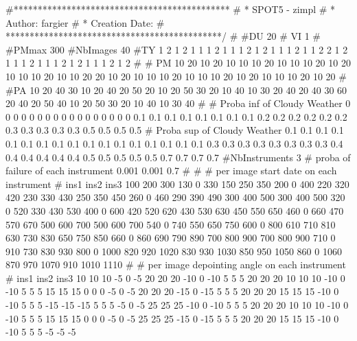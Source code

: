 #*********************************************
# * SPOT5 - zimpl
# * Author: fargier
# * Creation Date:
# *********************************************/
#
#DU
20
# VI
1
#
#PMmax
300
#NbImages
40
#TY
1
2
1
2
1
1
1
2
1
1
1
2
1
2
1
1
1
2
1
1
2
2
1
2
1
1
1
2
1
1
1
2
1
2
1
1
1
2
1
2
#
# PM
10
20
10
20
10
10
10
20
10
10
10
20
10
20
10
10
10
20
10
10
20
20
10
20
10
10
10
20
10
10
10
20
10
20
10
10
10
20
10
20
#
#PA
10
20
40
30
10
20
40
20
50
20
10
20
50
30
20
10
40
10
30
20
40
20
40
30
60
20
40
20
50
40
10
20
50
30
20
10
40
10
30
40
#
# Proba inf of Cloudy Weather
0
0
0
0
0
0
0
0
0
0
0
0
0
0
0
0
0
0.1
0.1
0.1
0.1
0.1
0.1
0.1
0.1
0.2
0.2
0.2
0.2
0.2
0.2
0.3
0.3
0.3
0.3
0.3
0.5
0.5
0.5
0.5
# Proba sup of Cloudy Weather
0.1
0.1
0.1
0.1
0.1
0.1
0.1
0.1
0.1
0.1
0.1
0.1
0.1
0.1
0.1
0.1
0.1
0.3
0.3
0.3
0.3
0.3
0.3
0.3
0.3
0.4
0.4
0.4
0.4
0.4
0.4
0.5
0.5
0.5
0.5
0.5
0.7
0.7
0.7
0.7
#NbInstruments
3
# proba of failure of each instrument
0.001
0.001
0.7
#
#
# per image start date on each instrument
# ins1 ins2 ins3
100 200 300
130 0 330
150 250 350
200 0 400
220 320 420
230 330 430
250 350 450
260 0 460
290 390 490
300 400 500
300 400 500
320 0 520
330 430 530
400 0 600
420 520 620
430 530 630
450 550 650
460 0 660
470 570 670
500 600 700
500 600 700
540 0 740
550 650 750
600 0 800
610 710 810
630 730 830
650 750 850
660 0 860
690 790 890
700 800 900
700 800 900
710 0 910
730 830 930
800 0 1000
820 920 1020
830 930 1030
850 950 1050
860 0 1060
870 970 1070
910 1010 1110
#
# per image depointing angle on each instrument
# ins1 ins2 ins3
10 10 10
-5 0 -5
20 20 20
-10 0 -10
5 5 5
20 20 20
10 10 10
-10 0 -10
5 5 5
15 15 15
0 0 0
-5 0 -5
20 20 20
-15 0 -15
5 5 5
20 20 20
15 15 15
-10 0 -10
5 5 5
-15 -15 -15
5 5 5
-5 0 -5
25 25 25
-10 0 -10
5 5 5
20 20 20
10 10 10
-10 0 -10
5 5 5
15 15 15
0 0 0
-5 0 -5
25 25 25
-15 0 -15
5 5 5
20 20 20
15 15 15
-10 0 -10
5 5 5
-5 -5 -5


